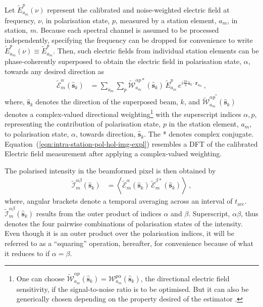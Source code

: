 \documentclass[
  journal=pasa,
  manuscript=article-type,
  year=2020,
  volume=37,
]{cup-journal}
\begin{document}
Let $\widetilde{E}_{a_m}^{p}(\nu)$ represent the calibrated and noise-weighted electric field at frequency, $\nu$, in polarisation state, $p$, measured by a station element, $a_m$, in station, $m$. Because each spectral channel is assumed to be processed independently, specifying the frequency can be dropped for convenience to write $\widetilde{E}_{a_m}^{p}(\nu)\equiv \widetilde{E}_{a_m}^{p}$. Then, such electric fields from individual station elements
can be phase-coherently superposed to obtain the electric field in polarisation state, $\alpha$, towards any desired direction as
\begin{align}
    \widetilde{\mathcal{E}}_m^\alpha(\hat{\boldsymbol{s}}_k) &= \sum_{a_m} \sum_p  \widetilde{\mathcal{W}}_{a_m}^{\alpha p *}(\hat{\boldsymbol{s}}_k) \, \widetilde{E}_{a_m}^p \, e^{i\frac{2\pi}{\lambda} \hat{\boldsymbol{s}}_k\cdot\boldsymbol{r}_{a_m}} \, , \label{eqn:intra-station-pol-hol-img-expl}
\end{align}
where, $\hat{\boldsymbol{s}}_k$ denotes the direction of the superposed beam, $k$,
and $\widetilde{\mathcal{W}}_{a_m}^{{\alpha p}^*}(\hat{\boldsymbol{s}}_k)$ denotes a complex-valued directional weighting\footnote{One can choose $\widetilde{\mathcal{W}}_{a_m}^{\alpha p}(\hat{\boldsymbol{s}}_k)=\mathcal{W}_{a_m}^{p\alpha}(\hat{\boldsymbol{s}}_k)$, the directional electric field sensitivity, if the signal-to-noise ratio is to be optimised. But it can also be generically chosen depending on the property desired of the estimator \cite[][]{Morales2011}.} with the superscript indices $\alpha, p$, representing the contribution of polarisation state, $p$ in the station element, $a_m$, to polarisation state, $\alpha$, towards direction, $\hat{\boldsymbol{s}}_k$. The * denotes complex conjugate. Equation~(\ref{eqn:intra-station-pol-hol-img-expl}) resembles a DFT of the calibrated Electric field measurement after applying a complex-valued weighting.

The polarised intensity in the beamformed pixel is then obtained by
\begin{align}
    \widetilde{\mathcal{I}}^{\alpha\beta}_m(\hat{\boldsymbol{s}}_k) &= \left\langle \widetilde{\mathcal{E}}_m^\alpha(\hat{\boldsymbol{s}}_k) \,  \widetilde{\mathcal{E}}_m^{\beta *}(\hat{\boldsymbol{s}}_k) \right\rangle \, , \label{eqn:intra-station-opt-pol-img-outprod}
\end{align}
where, angular brackets denote a temporal averaging across an interval of $t_\textrm{acc}$. $\widetilde{\mathcal{I}}^{\alpha\beta}_m(\hat{\boldsymbol{s}}_k)$ results from the outer product of indices $\alpha$ and $\beta$. Superscript, $\alpha\beta$, thus denotes the four pairwise combinations of polarisation states of the intensity. Even though it is an outer product over the polarisation indices, it will be referred to as a ``squaring'' operation, hereafter, for convenience because of what it reduces to if $\alpha=\beta$.
\end{document}

